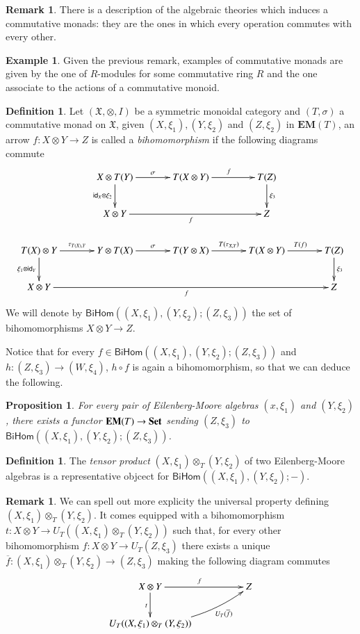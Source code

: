 \documentclass[12pt]{article}
\newtheorem{proposition}[lemma]{Proposition}
\theoremstyle{definition}
\newtheorem{definition}[lemma]{Definition}
\newtheorem{remark}[lemma]{Remark}
\newtheorem{example}[lemma]{Example}
\def\X{\mathfrak X}
\newcommand{\Set}{\textbf{\textup{Set}}}
\newcommand{\eim}[1]{\mathbf{EM}{(#1)}}
\newcommand{\bi}[3]{\mathsf{BiHom}(#1,#2;#3)}
\numberwithin{equation}{section}
\newcommand{\id}[1]{\mathsf{id}_{#1}}
\begin{document}
\begin{remark}There is a description of the algebraic theories which induces a commutative monads: they are the ones in which every operation commutes with every other.
\end{remark}
\begin{example}
	Given the previous remark, examples of commutative monads are given by the one of $R$-modules for some commutative ring $R$ and the one associate to the actions of a commutative monoid.
\end{example}
	
	\begin{definition}
		Let $(\X, \otimes, I)$ be a symmetric monoidal category and $(T,\sigma)$ a commutative monad on $\X$, given $(X, \xi_1), (Y, \xi_2)$ and $(Z, \xi_2)$ in $\eim{T}$, an arrow $f:X\otimes Y\to Z$ is called a \emph{bihomomorphism}  if the following diagrams commute
		\[\xymatrix@C=35pt{&X\otimes T(Y)  \ar[r]^{\sigma} \ar[d]_{\id{X}\otimes \xi_2} & T(X\otimes Y)  \ar[r]^{f}& T(Z) \ar[d]^{\xi_3}\\
	&	X\otimes Y \ar[rr]_{f} & & Z\\
T(X)\otimes Y \ar[d]_{\xi_1\otimes \id{Y}}\ar[r]^{\tau_ {T(X), Y}} & Y\otimes T(X) \ar[r]^\sigma& T(Y\otimes X) \ar[r]^{T(\tau_{X,Y})} & T(X\otimes Y) \ar[r]^{T(f)} & T(Z)\ar[d]^{\xi_3}\\
X\otimes Y \ar[rrrr]_{f} & & & & Z}\]
We will denote  by $\bi{(X,\xi_1)}{(Y,\xi_2)}{(Z,\xi_3)}$ the set of bihomomorphisms $X\otimes Y\to Z$.
	\end{definition}
	
	Notice that for every $f\in \bi{(X,\xi_1)}{(Y,\xi_2)}{(Z,\xi_3)}$ and $h:(Z, \xi_3)\to (W, \xi_4)$, $h\circ f$ is again a bihomomorphism, so that we can deduce the following.
	
	\begin{proposition}
	For every pair of Eilenberg-Moore algebras $(x, \xi_1)$ and $(Y, \xi_2)$, there exists a functor $\eim{T} \to \Set$ sending $(Z, \xi_3)$ to $\bi{(X,\xi_1)}{(Y,\xi_2)}{(Z,\xi_3)}$. 
	\end{proposition}

\begin{definition}
The \emph{tensor product} $(X, \xi_1)\otimes_T(Y, \xi_2)$ of two Eilenberg-Moore algebras is a representative objcect for  $\bi{(X,\xi_1)}{(Y,\xi_2)}{-}$.
\end{definition}

\begin{remark}
	We can spell out more explicity the universal property defining $(X, \xi_1)\otimes_T(Y, \xi_2)$. It comes equipped with a bihomomorphism $t:X\otimes Y\to U_T((X, \xi_1)\otimes_T(Y, \xi_2))$ such that, for every other bihomomorphism $f:X\otimes Y \to U_T(Z, \xi_3)$ there exists a unique $\overline{f}:(X, \xi_1)\otimes_T(Y, \xi_2)\to (Z, \xi_3)$ making the following diagram commutes
	\[\xymatrix@C=50pt{X\otimes Y  \ar[r]^{f} \ar[d]_{t}&  Z\\
	U_T((X, \xi_1)\otimes_T(Y, \xi_2)) \ar@/_0.3cm/[ur]_-{U_T(\overline{f})}}\]
\end{remark}
\end{document}
